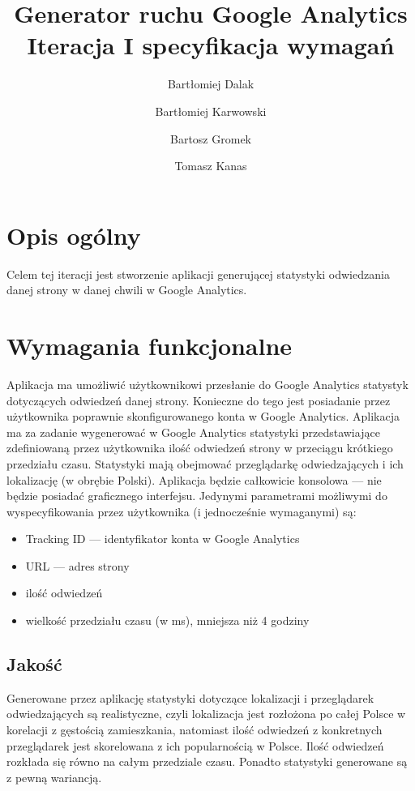 \documentclass{article}
\title{Generator ruchu Google Analytics \\ Iteracja I specyfikacja wymagań}
\author{Bartłomiej Dalak \and Bartłomiej Karwowski \and Bartosz Gromek \and Tomasz Kanas}
\begin{document}
\maketitle

\section{Opis ogólny}

Celem tej iteracji jest stworzenie aplikacji generującej statystyki odwiedzania danej strony w danej chwili w Google Analytics.

\section{Wymagania funkcjonalne}

Aplikacja ma umożliwić użytkownikowi przesłanie do Google Analytics statystyk dotyczących odwiedzeń danej strony. Konieczne do tego jest posiadanie przez użytkownika poprawnie skonfigurowanego konta w Google Analytics. Aplikacja ma za zadanie wygenerować w Google Analytics statystyki przedstawiające zdefiniowaną przez użytkownika ilość odwiedzeń strony w przeciągu krótkiego przedziału czasu. Statystyki mają obejmować przeglądarkę odwiedzających i ich lokalizację (w obrębie Polski). Aplikacja będzie całkowicie konsolowa --- nie będzie posiadać graficznego interfejsu. Jedynymi parametrami możliwymi do wyspecyfikowania przez użytkownika (i jednocześnie wymaganymi) są:
\begin{itemize}
\item Tracking ID --- identyfikator konta w Google Analytics
\item URL --- adres strony
\item ilość odwiedzeń
\item wielkość przedziału czasu (w ms), mniejsza niż 4 godziny
\end{itemize}

\subsection{Jakość}
Generowane przez aplikację statystyki dotyczące lokalizacji i przeglądarek odwiedzających są realistyczne, czyli lokalizacja jest rozłożona po całej Polsce w korelacji z gęstością zamieszkania, natomiast ilość odwiedzeń z konkretnych przeglądarek jest skorelowana z ich popularnością w Polsce. Ilość odwiedzeń rozkłada się równo na całym przedziale czasu. Ponadto statystyki generowane są z pewną wariancją.
\end{document}
